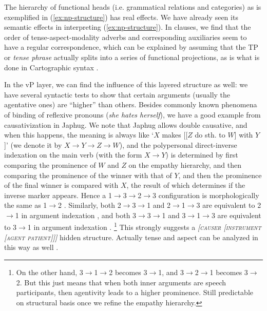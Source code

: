 \documentclass[a4paper, oneside, scheme=plain, 12pt]{article}
\newcommand*{\textto}{$\to$}
\newcommand*{\citesec}[1]{\S~{#1}}
\newcommand*{\citepage}[1]{p.~{#1}}
\newcommand*{\term}[1]{\emph{#1}}
\newcommand{\form}[1]{\emph{#1}}
\newcommand{\translate}[1]{`#1'}
\newcommand*{\category}[1]{\textsc{#1}}
\begin{document}
The hierarchy of functional heads (i.e. grammatical relations and categories)
as is exemplified in (\ref{ex:np-structure}) has real effects.
We have already seen its semantic effects in interpreting (\ref{ex:np-structure}).
In clauses, we find that the order of tense-aspect-modality adverbs and corresponding auxiliaries seem to have a regular correspondence,
which can be explained by assuming that the TP or \term{tense phrase}
actually splits into a series of functional projections,
as is what is done in Cartographic syntax \citep{cinque2009cartography}.

In the vP layer, we can find the influence of this layered structure as well:
we have several syntactic tests to show that certain arguments (usually the agentative ones)
are ``higher'' than others.
Besides commonly known phenomena of binding of reflexive pronouns (\form{she hates herself}),
we have a good example from causativization in Japhug.
We note that Japhug allows double causative,
and when this happens, the meaning is always like 
\translate{$X$ makes [[$Z$ do sth. to $W$] with $Y$]}
(we denote it by $X \to Y \to Z \to W$),
and the polypersonal direct-inverse indexation on the main verb (with the form $X \to Y$)
is determined by first comparing the prominence of $W$ and $Z$ on the empathy hierarchy,
and then comparing the prominence of the winner with that of $Y$,
and then the prominence of the final winner is compared with $X$,
the result of which determines if the inverse marker appears.
Hence a 1\textto 3\textto 2\textto 3 configuration
is morphologically the same as 1\textto 2
\citep[\citepage{848}, (67)]{jacques2021grammar}.
Similarly, both 2\textto 3\textto 1 and 2\textto 1\textto 3 
are equivalent to 2\textto 1 in argument indexation
\citep[\citepage{584}]{jacques2021grammar},
and both 3\textto 3\textto 1 and 3\textto 1\textto 3 
are equivalent to 3\textto 1 in argument indexation
\citep[\citepage{310}]{jacques2021grammar}.%
\footnote{
    On the other hand, 3\textto 1\textto 2 becomes 3\textto 1,
    and 3\textto 2\textto 1 becomes 3\textto 2.
    But this just means that when both inner arguments are speech participants,
    then agentivity leads to a higher prominence.
    Still predictable on structural basis
    once we refine the empathy hierarchy.
}
This strongly suggests a \form{[\category{causer} [\category{instrument} [\category{agent} \category{patient}]]]} hidden structure.
Actually tense and aspect can be analyzed in this way as well 
\citet[\citesec{7.4.1}]{wiltschko2014universal}.
\end{document}
